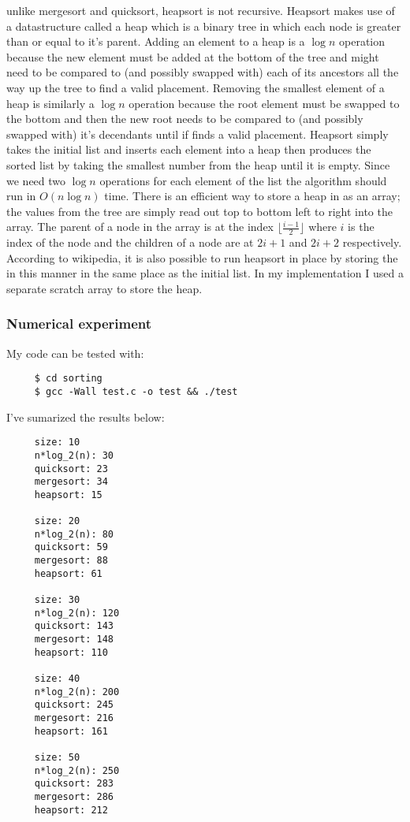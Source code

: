 \documentclass[11pt]{article}
\begin{document}
    unlike mergesort and quicksort, heapsort is not recursive.
    Heapsort makes use of a datastructure called a heap which is a
    binary tree in which each node is greater than or equal to it's
    parent.  Adding an element to a heap is a $\log{n}$ operation
    because the new element must be added at the bottom of the tree
    and might need to be compared to (and possibly swapped with) each
    of its ancestors all the way up the tree to find a valid
    placement.  Removing the smallest element of a heap is similarly a
    $\log{n}$ operation because the root element must be swapped to
    the bottom and then the new root needs to be compared to (and
    possibly swapped with) it's decendants until if finds a valid
    placement.  Heapsort simply takes the initial list and inserts
    each element into a heap then produces the sorted list by taking
    the smallest number from the heap until it is empty.  Since we
    need two $\log{n}$ operations for each element of the list the
    algorithm should run in $O(n \log{n})$ time.  There is an
    efficient way to store a heap in as an array; the values from the
    tree are simply read out top to bottom left to right into the
    array.  The parent of a node in the array is at the index $\lfloor
    \frac{i - 1}{2} \rfloor$ where $i$ is the index of the node and
    the children of a node are at $2i + 1$ and $2i + 2$ respectively.
    According to wikipedia, it is also possible to run heapsort in
    place by storing the in this manner in the same place as the
    initial list.  In my implementation I used a separate scratch
    array to store the heap.
    
\subsubsection*{Numerical experiment}
\label{sec-1.1.4}

    My code can be tested with:
    
\begin{verbatim}
     $ cd sorting
     $ gcc -Wall test.c -o test && ./test
\end{verbatim}

    
    \noindent
    I've sumarized the results below:
    
\begin{verbatim}
     size: 10
     n*log_2(n): 30
     quicksort: 23
     mergesort: 34
     heapsort: 15
     
     size: 20
     n*log_2(n): 80
     quicksort: 59
     mergesort: 88
     heapsort: 61
     
     size: 30
     n*log_2(n): 120
     quicksort: 143
     mergesort: 148
     heapsort: 110
     
     size: 40
     n*log_2(n): 200
     quicksort: 245
     mergesort: 216
     heapsort: 161
     
     size: 50
     n*log_2(n): 250
     quicksort: 283
     mergesort: 286
     heapsort: 212
\end{verbatim}
\end{document}

